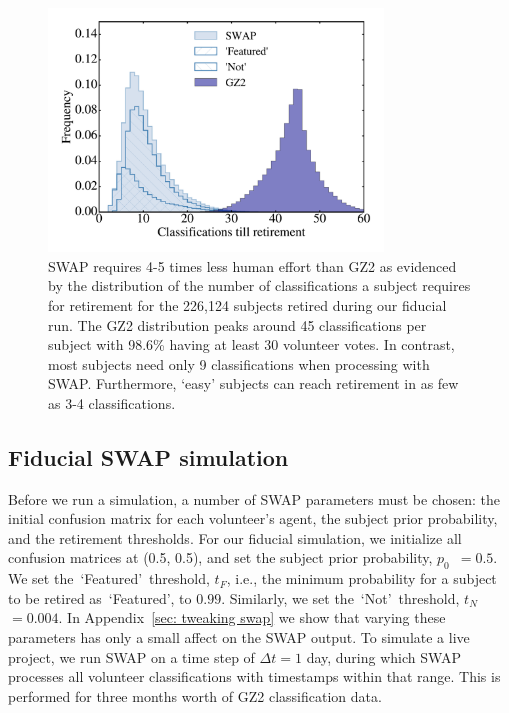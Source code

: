 \documentclass[twocolumn]{aastex6}
\newcommand{\p}{$p_0$}
\newcommand{\tf}{$t_F$}
\newcommand{\tn}{$t_N$}
\newcommand{\feat}{`Featured'}
\newcommand{\notfeat}{`Not'}
\begin{document}
\begin{figure}[t!] 
\centering
\includegraphics[width=3.5in]{f4.pdf}
\caption{SWAP requires 4-5 times less human effort than GZ2 as evidenced by the distribution of the number of classifications a subject requires for retirement for the 226,124 subjects retired during our fiducial run.  The GZ2 distribution peaks around 45 classifications per subject with 98.6\% having at least 30 volunteer votes. In contrast, most subjects need only 9 classifications when processing with SWAP.  Furthermore,  `easy' subjects can reach retirement in as few as 3-4 classifications. \label{fig: swap vote distributions}}
\end{figure}


\subsection{Fiducial SWAP simulation}\label{sec: fiducial}


Before we run a simulation, a number of SWAP parameters must be chosen: 
 the initial confusion matrix for each volunteer's agent, the subject 
prior probability, and the retirement thresholds. 
For our fiducial  simulation, we initialize all confusion matrices at (0.5, 0.5), 
and set the subject prior probability, \p~$= 0.5$. 
We set the~\feat~threshold, \tf, i.e., the minimum probability for a subject to be retired as~\feat, to $0.99$. Similarly, we set the~\notfeat~threshold, \tn~$= 0.004$. 
In Appendix~\ref{sec: tweaking swap} 
we show that varying these parameters has only a small affect on the SWAP output. 
To simulate a live project, we run SWAP on a time step of $\Delta t = 1$ day, 
during which SWAP processes all volunteer classifications with timestamps 
within that range. This is performed for three months worth of GZ2 classification data. 
\end{document}
